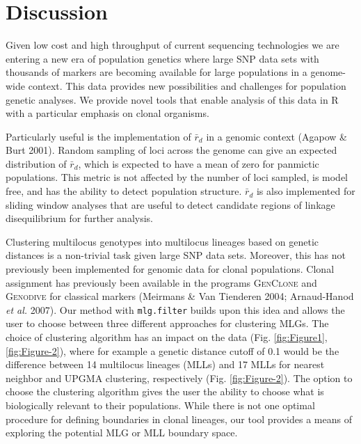 \documentclass[double,12pt]{beavtex}
\begin{document}
  \section{Discussion}\label{discussion}
  
  Given low cost and high throughput of current sequencing technologies we
  are entering a new era of population genetics where large SNP data sets
  with thousands of markers are becoming available for large populations
  in a genome- wide context. This data provides new possibilities and
  challenges for population genetic analyses. We provide novel tools that
  enable analysis of this data in R with a particular emphasis on clonal
  organisms.
  
  Particularly useful is the implementation of \(\bar{r}_d\) in a genomic
  context (Agapow \& Burt 2001). Random sampling of loci across the genome
  can give an expected distribution of \(\bar{r}_d\), which is expected to
  have a mean of zero for panmictic populations. This metric is not
  affected by the number of loci sampled, is model free, and has the
  ability to detect population structure. \(\bar{r}_d\) is also
  implemented for sliding window analyses that are useful to detect
  candidate regions of linkage disequilibrium for further analysis.
  
  Clustering multilocus genotypes into multilocus lineages based on
  genetic distances is a non-trivial task given large SNP data sets.
  Moreover, this has not previously been implemented for genomic data for
  clonal populations. Clonal assignment has previously been available in
  the programs \textsc{GenClone} and \textsc{Genodive} for classical
  markers (Meirmans \& Van Tienderen 2004; Arnaud-Hanod \emph{et al.}
  2007). Our method with \texttt{mlg.filter} builds upon this idea and
  allows the user to choose between three different approaches for
  clustering MLGs. The choice of clustering algorithm has an impact on the
  data (Fig. \ref{fig:Figure1}, \ref{fig:Figure-2}), where for example a
  genetic distance cutoff of 0.1 would be the difference between 14
  multilocus lineages (MLLs) and 17 MLLs for nearest neighbor and UPGMA
  clustering, respectively (Fig. \ref{fig:Figure-2}). The option to choose
  the clustering algorithm gives the user the ability to choose what is
  biologically relevant to their populations. While there is not one
  optimal procedure for defining boundaries in clonal lineages, our tool
  provides a means of exploring the potential MLG or MLL boundary space.
  
\end{document}

